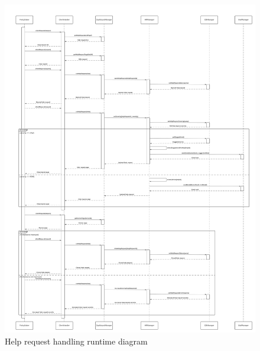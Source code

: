 \documentclass[10pt]{article} %
\begin{document}
\begin{figure}[h!]
    \centering
    \centerline{\includegraphics[scale=0.272]{images/rv/helpRequestHandling.png}}
    \caption{Help request handling runtime diagram}
    \label{fig:r_hr2}
\end{figure}
\end{document}
